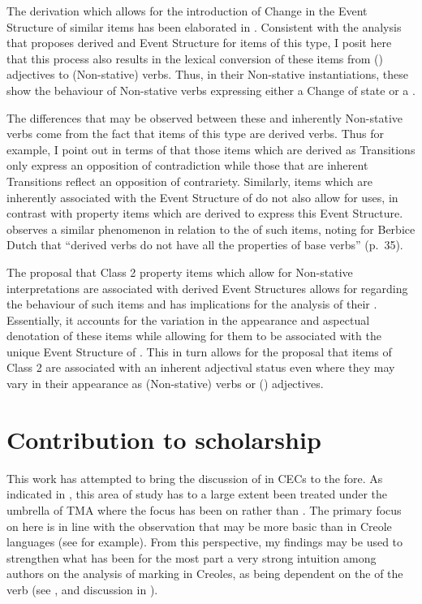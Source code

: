 The derivation which allows for the introduction of Change in the Event Structure of similar items has been elaborated in . Consistent with the analysis that proposes derived  and  Event Structure for items of this type, I posit here that this process also results in the lexical conversion of these items from () adjectives to (Non-stative) verbs. Thus, in their Non-stative instantiations, these show the behaviour of Non-stative verbs expressing either a Change of state or a . 

The differences that may be observed between these and inherently Non-sta\-tive verbs come from the fact that items of this type are derived verbs. Thus for example, I point out in terms of  that those items which are derived as Transitions only express an opposition of contradiction while those that are inherent Transitions reflect an opposition of contrariety. Similarly, items which are inherently associated with the Event Structure of  do not also allow for  uses, in contrast with property items which are derived to express this Event Structure. \citet{Kouwenberg1996} observes a similar phenomenon in relation to the  of such items, noting for Berbice Dutch that ``derived verbs do not have all the properties of base verbs” (p.~35).

The proposal that Class 2 property items which allow for Non-stative interpretations are associated with derived Event Structures allows for  regarding the behaviour of such items and has implications for the analysis of their . Essentially, it accounts for the variation in the appearance and aspectual denotation of these items while allowing for them to be associated with the unique Event Structure of . This in turn allows for the proposal that items of Class 2 are associated with an inherent adjectival status even where they may vary in their appearance as (Non-stative) verbs or () adjectives. 


\section{Contribution to scholarship}\label{sec:6.2}

This work has attempted to bring the discussion of  in CECs to the fore. As indicated in , this area of study has to a large extent been treated under the umbrella of TMA where the focus has been on  rather than . The primary focus on  here is in line with the observation that  may be more basic than  in Creole languages (see \citealt{Alleyne1980} for example). From this perspective, my findings may be used to strengthen what has been for the most part a very strong intuition among authors on the analysis of  marking in Creoles, as being dependent on the  of the verb (see \citealt{Winford1993}, and discussion in ). 

